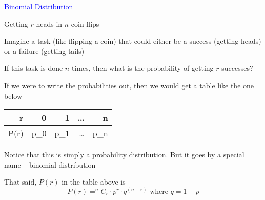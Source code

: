 \documentclass[14pt,fleqn]{extarticle}
\begin{document}
\begin{skill}
\textcolor{blue}{Binomial Distribution}

Getting $r$ heads in $n$ coin flips
\end{skill}

%

\newcard

Imagine a task (like flipping a coin) that
could either be a success (getting heads)
or a failure (getting tails)\newline

If this task is done $n$ times, then what
is the probability of getting $r$ successes?\newline 

If we were to write the probabilities out, then we would get a table like 
the one below 

%
\begin{center}
\begin{tabular}{NNNNN}
\midrule 
r & 0 & 1 & \ldots & n \\
\midrule 
P(r) & p_0 & p_1 & \ldots & p_n \\
\midrule
\end{tabular}
\end{center} 

Notice that this is simply a probability distribution. But it goes by a 
special name -- binomial distribution \newline 

That said, $P(r)$ in the table above is
\[P(r) = ^nC_r\cdot p^r\cdot q^{(n-r)} \text{ where } q = 1- p \]
\end{document}
